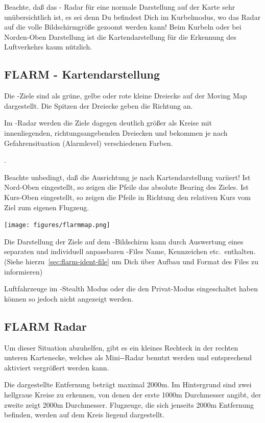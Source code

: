 Beachte, daß das \fl- Radar für eine normale Darstellung auf der Karte sehr unübersichtlich ist, es sei denn
Du befindest Dich im Kurbelmodus, wo das Radar auf die volle Bildschirmgröße gezoomt werden kann!
Beim Kurbeln oder bei Norden-Oben Darstellung ist die Kartendarstellung für die Erkennung des Luftverkehrs
kaum nützlich.

\subsection*{FLARM - Kartendarstellung}
Die \fl-Ziele sind als grüne, gelbe  oder rote kleine Dreiecke auf der Moving Map dargestellt.
Die Spitzen der Dreiecke geben die Richtung an.

Im \fl-Radar werden die Ziele dagegen deutlich größer als Kreise mit innenliegenden,
richtungsangebenden Dreiecken  und bekommen je nach Gefahrensituation (Alarmlevel)
verschiedenen Farben.

.

\achtung Beachte unbedingt, daß die Ausrichtung je nach Kartendarstellung variiert!
Ist Nord-Oben eingestellt, so zeigen die Pfeile das absolute Bearing des Zieles.
Ist Kurs-Oben eingestellt, so zeigen die Pfeile in Richtung den relativen Kurs vom Ziel
zum eigenen Flugzeug.


\begin{center}
\texttt{[image: figures/flarmmap.png]}
\end{center}

Die Darstellung der Ziele auf dem \fl-Bildschirm kann durch Auswertung eines separaten
und individuell anpassbaren  \fl-Files Name, Kennzeichen etc.\ enthalten.
(Siehe hierzu~\ref{sec:flarm-ident-file} um Dich über Aufbau und Format des Files zu informieren)

Luftfahrzeuge im \fl-Stealth Modus oder die den Privat-Modus eingeschaltet haben können so jedoch nicht angezeigt werden.

\subsection*{FLARM Radar}
Um dieser Situation abzuhelfen, gibt es ein kleines Rechteck in der rechten unteren Kartenecke,
welches als Mini-\fl-Radar benutzt werden und entsprechend aktiviert vergrößert werden kann.

Die dargestellte Entfernung beträgt maximal 2000m. Im Hintergrund sind zwei hellgraue Kreise zu erkennen,
von denen der erste 1000m Durchmesser angibt, der zweite zeigt 2000m Durchmesser.
Flugzeuge, die sich jenseits 2000m Entfernung befinden, werden auf dem Kreis liegend dargestellt.

